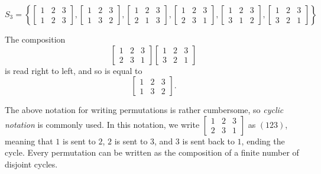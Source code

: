 \documentclass[12pt]{article}
\begin{document}
\begin{exmp}
    \[S_3 = \left\{
        \begin{bmatrix}
            1 & 2 & 3 \\ 1 & 2 & 3
        \end{bmatrix},
        \begin{bmatrix}
            1 & 2 & 3 \\ 1 & 3 & 2
        \end{bmatrix},
        \begin{bmatrix}
            1 & 2 & 3 \\ 2 & 1 & 3
        \end{bmatrix},
        \begin{bmatrix}
            1 & 2 & 3 \\ 2 & 3 & 1
        \end{bmatrix},
        \begin{bmatrix}
            1 & 2 & 3 \\ 3 & 1 & 2
        \end{bmatrix},
        \begin{bmatrix}
            1 & 2 & 3 \\ 3 & 2 & 1
        \end{bmatrix}
    \right\}\]

    The composition
    \[\begin{bmatrix}
        1 & 2 & 3 \\ 2 & 3 & 1
    \end{bmatrix}
    \begin{bmatrix}
        1 & 2 & 3 \\ 3 & 2 & 1
    \end{bmatrix}\] is read right to left, and so is equal to
    \[\begin{bmatrix}
        1 & 2 & 3 \\ 1 & 3 & 2
    \end{bmatrix}.\]
\end{exmp}

\begin{defn}
    The above notation for writing permutations is rather cumbersome, so \emph{cyclic notation} is commonly used. In this notation, we write $\begin{bmatrix}
        1 & 2 & 3 \\ 2 & 3 & 1
    \end{bmatrix}$ as $(123)$, meaning that $1$ is sent to $2$, $2$ is sent to $3$, and $3$ is sent back to $1$, ending the cycle. Every permutation can be written as the composition of a finite number of disjoint cycles.
\end{defn}
\end{document}
